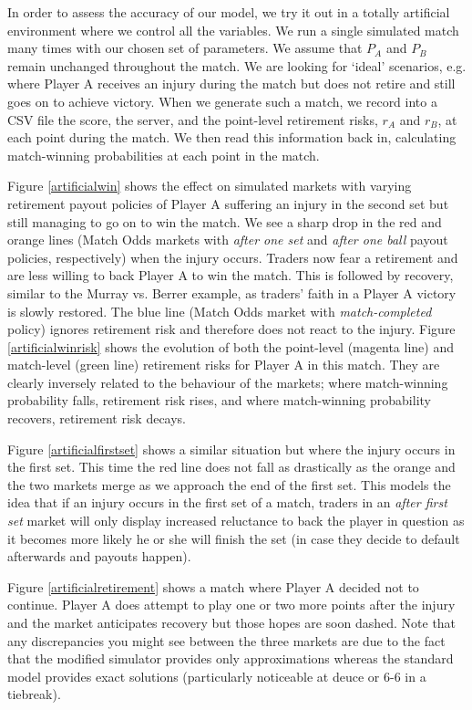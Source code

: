 \documentclass[authoryear, 12pt]{elsarticle}
\begin{document}
In order to assess the accuracy of our model, we try it out in a totally artificial environment where we control all the variables.  We run a single simulated match many times with our chosen set of parameters.  We assume that $P_A$ and $P_B$ remain unchanged throughout the match.  We are looking for `ideal' scenarios, e.g. where Player A receives an injury during the match but does not retire and still goes on to achieve victory.  When we generate such a match, we record into a CSV file the score, the server, and the point-level retirement risks, $r_A$ and $r_B$, at each point during the match.  We then read this information back in, calculating match-winning probabilities at each point in the match.

Figure \ref{artificialwin} shows the effect on simulated markets with varying retirement payout policies of Player A suffering an injury in the second set but still managing to go on to win the match.  We see a sharp drop in the red and orange lines (Match Odds markets with \textit{after one set} and \textit{after one ball} payout policies, respectively) when the injury occurs.  Traders now fear a retirement and are less willing to back Player A to win the match.  This is followed by recovery, similar to the Murray vs. Berrer example, as traders' faith in a Player A victory is slowly restored.  The blue line (Match Odds market with \textit{match-completed} policy) ignores retirement risk and therefore does not react to the injury.  Figure \ref{artificialwinrisk} shows the evolution of both the point-level (magenta line) and match-level (green line) retirement risks for Player A in this match.  They are clearly inversely related to the behaviour of the markets; where match-winning probability falls, retirement risk rises, and where match-winning probability recovers, retirement risk decays.

Figure \ref{artificialfirstset} shows a similar situation but where the injury occurs in the first set.  This time the red line does not fall as drastically as the orange and the two markets merge as we approach the end of the first set.  This models the idea that if an injury occurs in the first set of a match, traders in an \textit{after first set} market will only display increased reluctance to back the player in question as it becomes more likely he or she will finish the set (in case they decide to default afterwards and payouts happen).

Figure \ref{artificialretirement} shows a match where Player A decided not to continue.  Player A does attempt to play one or two more points after the injury and the market anticipates recovery but those hopes are soon dashed.  Note that any discrepancies you might see between the three markets are due to the fact that the modified simulator provides only approximations whereas the standard model provides exact solutions (particularly noticeable at deuce or 6-6 in a tiebreak).
\end{document}
